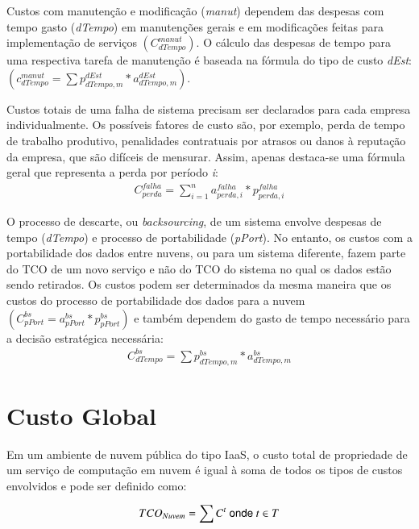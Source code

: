 \documentclass[tese,capa]{texufpel}
\begin{document}
Custos com manutenção e modificação (\emph{manut}) dependem das despesas com tempo gasto (\emph{dTempo}) em manutenções gerais e em modificações feitas para implementação de serviços $\left(C^{manut}_{dTempo}\right)$. O cálculo das despesas de tempo para uma respectiva tarefa de manutenção é baseada na fórmula do tipo de custo \emph{dEst}: $\left(c^{manut}_{dTempo} = \sum p^{dEst}_{dTempo,m} * a^{dEst}_{dTempo,m}\right)$.

Custos totais de uma falha de sistema precisam ser declarados para cada empresa individualmente. Os possíveis fatores de custo são, por exemplo, perda de tempo de trabalho produtivo, penalidades contratuais por atrasos ou danos à reputação da empresa, que são difíceis de mensurar. Assim, apenas destaca-se uma fórmula geral que representa a perda por período \emph{i}:
\begin{eqnarray*}
C^{falha}_{perda} = \sum\limits^{n}_{i=1} a^{falha}_{perda,i} * p^{falha}_{perda,i}
\end{eqnarray*}

O processo de descarte, ou \emph{backsourcing}, de um sistema envolve despesas de tempo (\emph{dTempo}) e processo de portabilidade (\emph{pPort}). No entanto, os custos com a portabilidade dos dados entre nuvens, ou para um sistema diferente, fazem parte do TCO de um novo serviço e não do TCO do sistema no qual os dados estão sendo retirados. Os custos podem ser determinados da mesma maneira que os custos do processo de portabilidade dos dados para a nuvem $\left(C^{bs}_{pPort} = a^{bs}_{pPort} * p^{bs}_{pPort}\right)$ e também dependem do gasto de tempo necessário para a decisão estratégica necessária:
\begin{eqnarray*}
C^{bs}_{dTempo} = \sum p^{bs}_{dTempo,m} * a^{bs}_{dTempo,m}
\end{eqnarray*}

\section{Custo Global}
\label{sec:custoglobal}
Em um ambiente de nuvem pública do tipo IaaS, o custo total de propriedade de um serviço de computação em nuvem é igual à soma de todos os tipos de custos envolvidos e pode ser definido como:

\begin{equation*}
  \centering
  \begin{aligned}
    TCO_{Nuvem} = \sum C^t ~\textsf{onde}~ t \in T
  \end{aligned}
  \label{eq:tco}
\end{equation*}
\end{document}
